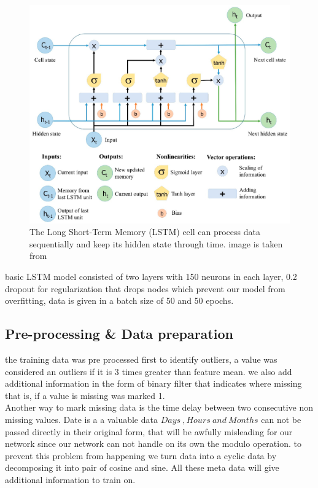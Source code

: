 \begin{figure}[H]
\centering
\includegraphics[scale=.55]{img/The_LSTM_cell.png} 
\caption{The Long Short-Term Memory (LSTM) cell can process data sequentially and keep its hidden state through time. image is taken from  \cite{}}
\label{fig:lstmcell}
\end{figure}

basic LSTM model consisted of two layers with  150 neurons in each layer, 0.2 dropout for regularization that drops nodes which prevent our model from overfitting, data is given in a batch size of 50 and 50 epochs.



\subsection{Pre-processing \&  Data preparation}
the training data was pre processed first to identify  outliers, a value was considered an outliers if it is 3 times greater than feature mean. we also add additional information in the form of  binary filter that indicates where missing that is, if a value is missing was marked 1.\\ 
Another way to mark missing data is the time delay between two consecutive non missing values.
Date is a a valuable data $Days\ ,Hours\ and\ Months$ can not be passed directly in their original form, that will be awfully misleading for our network since our network can not handle on its own the modulo operation. to prevent this problem  from happening we turn data into a cyclic data by decomposing it into pair of cosine and sine.
All these meta data will give additional information to train on.

